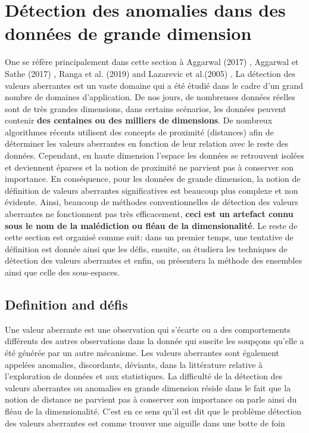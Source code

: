 \section{Détection des anomalies dans des données de grande dimension}
%
One se réfère principalement dans cette section  à Aggarwal (2017) \cite{A1}, Aggarwal et Sathe (2017) \cite{A8}, Ranga et al. (2019) \cite{A10} and Lazarevic et al.(2005) \cite{A14} .\newl 
La détection des valeurs aberrantes est un vaste domaine qui a été étudié dans le cadre d’un grand nombre de domaines d’application. De nos jours, de nombreuses données réelles sont de très grandes dimensions, dans certains scénarios, les données peuvent contenir \textbf{des centaines ou des milliers de dimensions}. De nombreux algorithmes récents utilisent des concepts de proximité (distances) afin de déterminer les valeurs aberrantes en fonction de leur relation avec le reste des données.  Cependant,  en haute dimension l’espace les données se retrouvent  isolées et deviennent éparses et la notion de proximité ne parvient pas à conserver son importance. En conséquence, pour les données de grande dimension, la notion de définition de valeurs aberrantes significatives est beaucoup plus complexe et non évidente.  Ainsi, beaucoup de  méthodes conventionnelles de  détection des valeurs aberrantes ne fonctionnent pas très efficacement, \textbf{ceci est un artefact connu sous le nom de  la malédiction ou fléau de la dimensionalité}. \newl
Le reste de cette section est organisé comme suit: dans un premier temps, une tentative de définition est donnée ainsi que les défis, ensuite, on étudiera les techniques de détection des valeurs aberrantes et enfin, on présentera la méthode des ensembles ainsi que celle des sous-espaces. 
%
%
\subsection{Definition and défis}
%
%
Une valeur aberrante est une observation qui s'écarte ou a des comportements différents des autres observations dans la donnée qui suscite les soupçons qu'elle a été générée par un autre
mécanisme. Les valeurs aberrantes sont également appelées anomalies, discordants, déviants,
dans la littérature relative à l'exploration de données et aux statistiques. \cite{A1}\newl
La difficulté de la détection des valeurs aberrantes ou anomalies en grande dimension réside dans le fait que la notion de distance ne parvient pas à conserver son importance on parle ainsi du fléau de la dimensionalité. C'est en ce sens qu'il est dit que le problème détection des valeurs aberrantes est comme trouver une aiguille dans une botte de foin \cite{A14}
%
